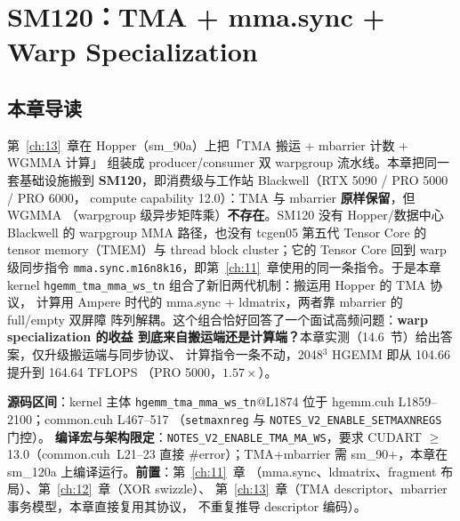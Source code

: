 \providecommand{\url}[1]{\texttt{#1}}
\chapter{SM120：TMA + mma.sync + Warp Specialization}\label{ch:14}

\section{本章导读}

第~\ref{ch:13}~章在 Hopper（sm\_90a）上把「TMA 搬运 + mbarrier 计数 + WGMMA 计算」
组装成 producer/consumer 双 warpgroup 流水线。本章把同一套基础设施搬到
\textbf{SM120}，即消费级与工作站 Blackwell（RTX 5090 / PRO 5000 / PRO 6000，
compute capability 12.0）：TMA 与 mbarrier \textbf{原样保留}，但 WGMMA
（warpgroup 级异步矩阵乘）\textbf{不存在}。SM120 没有 Hopper/数据中心 Blackwell 的
warpgroup MMA 路径，也没有 tcgen05 第五代 Tensor Core 的 tensor memory（TMEM）与
thread block cluster；它的 Tensor Core 回到 warp 级同步指令
\texttt{mma.\allowbreak{}sync.\allowbreak{}m16n8k16}，即第~\ref{ch:11}~章使用的同一条指令。于是本章 kernel
\texttt{hgemm\_\allowbreak{}tma\_\allowbreak{}mma\_\allowbreak{}ws\_\allowbreak{}tn} 组合了新旧两代机制：搬运用 Hopper 的 TMA 协议，
计算用 Ampere 时代的 mma.sync + ldmatrix，两者靠 mbarrier 的 full/empty 双屏障
阵列解耦。这个组合恰好回答了一个面试高频问题：\textbf{warp specialization 的收益
到底来自搬运端还是计算端？}本章实测（14.6~节）给出答案，仅升级搬运端与同步协议、
计算指令一条不动，2048$^3$ HGEMM 即从 104.66 提升到 164.64 TFLOPS
（PRO 5000，$1.57\times$）。

\textbf{源码区间}：kernel 主体 \texttt{hgemm\_\allowbreak{}tma\_\allowbreak{}mma\_\allowbreak{}ws\_\allowbreak{}tn}@L1874 位于
hgemm.cuh L1859--2100；common.cuh L467--517
（\texttt{setmaxnreg} 与 \texttt{NOTES\_\allowbreak{}V2\_\allowbreak{}ENABLE\_\allowbreak{}SETMAXNREGS} 门控）。
\textbf{编译宏与架构限定}：\texttt{NOTES\_\allowbreak{}V2\_\allowbreak{}ENABLE\_\allowbreak{}TMA\_\allowbreak{}MA\_\allowbreak{}WS}，要求
CUDART $\ge$ 13.0（common.cuh~L21--23 直接 \#error）；TMA+mbarrier 需
sm\_90+，本章在 sm\_120a 上编译运行。\textbf{前置}：第~\ref{ch:11}~章
（mma.sync、ldmatrix、fragment 布局）、第~\ref{ch:12}~章（XOR swizzle）、
第~\ref{ch:13}~章（TMA descriptor、mbarrier 事务模型，本章直接复用其协议，
不重复推导 descriptor 编码）。

